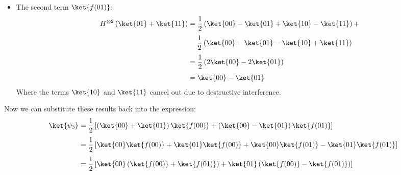 \begin{enumerate}[label={\textbf{Step \arabic*.}}, leftmargin=2cm]
\begin{itemize}
            \item The second term $\ket{f(01)}$:
                \begin{align*}
                    H^{\otimes 2} \left(\ket{01} + \ket{11}\right)
                    &=
                    \frac{1}{2} \left(\ket{00} - \ket{01} + \ket{10} - \ket{11}\right)
                    +\\[.3em]
                    &\quad\; \frac{1}{2} \left(\ket{00} - \ket{01} - \ket{10} + \ket{11}\right) \\[.3em]
                    &=
                    \frac{1}{2} \left(
                        2\ket{00} - 2\ket{01}
                    \right) \\[.3em]
                    &=
                    \ket{00} - \ket{01}
                \end{align*}
                Where the terms $\ket{10}$ and $\ket{11}$ cancel out due to destructive interference.
        \end{itemize}
        Now we can substitute these results back into the expression:
        \begin{align*}
            \ket{\psi_3} &= \frac{1}{2} \left[
                \left(\ket{00} + \ket{01}\right) \ket{f(00)} +
                \left(\ket{00} - \ket{01}\right) \ket{f(01)}
            \right] \\[.3em]
            &= \frac{1}{2} \left[
                \ket{00} \ket{f(00)} + \ket{01} \ket{f(00)} +
                \ket{00} \ket{f(01)} - \ket{01} \ket{f(01)}
            \right] \\[.3em]
            &= \frac{1}{2} \left[
                \ket{00} \left(\ket{f(00)} + \ket{f(01)}\right) +
                \ket{01} \left(\ket{f(00)} - \ket{f(01)}\right)
            \right]
        \end{align*}


\end{enumerate}
